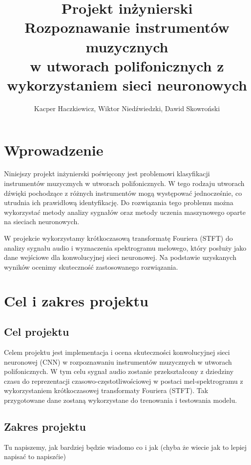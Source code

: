 \documentclass[12pt, a4paper]{article}
\title{\textbf {\Huge{Projekt inżynierski}}\\ \vspace{3pt}
    \Large{{Rozpoznawanie instrumentów muzycznych
    \\ w utworach polifonicznych z wykorzystaniem sieci neuronowych}}}
\author{
    Kacper Haczkiewicz,
    Wiktor Niedźwiedzki,
    Dawid Skowroński
}
\date{}
\theoremstyle{definition}
\theoremstyle{plain}
\theoremstyle{remark}
\begin{document}
\maketitle

\tableofcontents
\newpage

\section{Wprowadzenie}

Niniejszy projekt inżynierski poświęcony jest problemowi klasyfikacji instrumentów muzycznych w utworach polifonicznych. W tego rodzaju utworach dźwięki pochodzące z różnych instrumentów mogą występować jednocześnie, co utrudnia ich prawidłową identyfikację. Do rozwiązania tego problemu można wykorzystać metody analizy sygnałów oraz metody uczenia maszynowego oparte na sieciach neuronowych.

W projekcie wykorzystamy krótkoczasową transformatę Fouriera (STFT) do analizy sygnału audio i wyznaczenia spektrogramu melowego, który posłuży jako dane wejściowe dla konwolucyjnej sieci neuronowej. Na podstawie uzyskanych wyników ocenimy skuteczność zastosowanego rozwiązania.


\section{Cel i zakres projektu}

\subsection{Cel projektu}

Celem projektu jest implementacja i ocena skuteczności konwolucyjnej sieci neuronowej (CNN) w rozpoznawaniu instrumentów muzycznych w utworach polifonicznych. W tym celu sygnał audio zostanie przekształcony z dziedziny czasu do reprezentacji czasowo-częstotliwościowej w postaci mel-spektrogramu z wykorzystaniem krótkoczasowej transformaty Fouriera (STFT). Tak przygotowane dane zostaną wykorzystane do trenowania i testowania modelu.

\subsection{Zakres projektu}

Tu napiszemy, jak bardziej będzie wiadomo co i jak (chyba że wiecie jak to lepiej napisać to napiszćie)

\newpage
\end{document}

